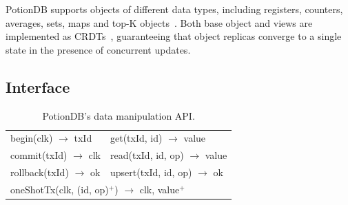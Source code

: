 \documentclass[sigplan,twocolumn,review,anonymous]{acmart}
\newcommand{\code}[1]{\textsf{\small{#1}}}
\begin{document}
PotionDB supports objects of different data types, including registers, counters, averages, sets, maps
and top-K objects~\cite{Cabrita17Nonuniform}.
Both base object and views are implemented as CRDTs~\cite{crdt}, guaranteeing that object replicas converge to a single state
in the presence of concurrent updates.

\subsection{Interface}
\label{subsec:interface}

\begin{smaller}
\begin{table}[t]
\center
	\begin{tabular}{ll} 
		\toprule
		 \code{begin(clk) $\rightarrow$ txId}                    & \code{get(txId, id) $\rightarrow$ value}            \\
		 \code{commit(txId) $\rightarrow$ clk}            & \code{read(txId, id, op) $\rightarrow$ value}          \\
		  \code{rollback(txId) $\rightarrow$ ok}        & \code{upsert(txId, id, op) $\rightarrow$ ok}                        \\[4pt]
		\multicolumn{2}{l}{\code{oneShotTx(clk, (id, op)$^+$) $\rightarrow$ clk, value$^+$}} \\
		\bottomrule
	\end{tabular}
	\caption{PotionDB's data manipulation API.}
	\label{table:PotionDB_API}
	\vspace{-20pt}
\end{table}
\end{smaller}
\end{document}
